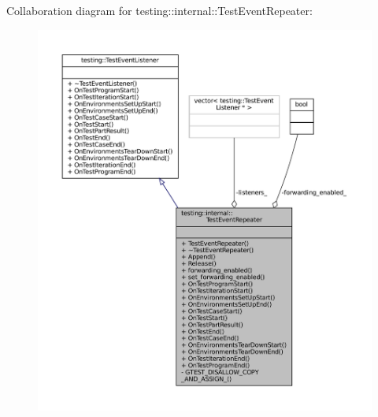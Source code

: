 Collaboration diagram for testing\+:\+:internal\+:\+:Test\+Event\+Repeater\+:
\nopagebreak
\begin{figure}[H]
\begin{center}
\leavevmode
\includegraphics[width=350pt]{classtesting_1_1internal_1_1TestEventRepeater__coll__graph}
\end{center}
\end{figure}
